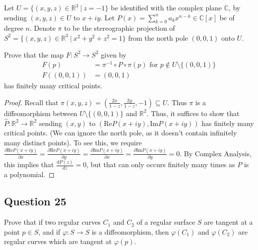\documentclass[12pt]{article}
\begin{document}
Let $U = \{(x, y, z) \in \mathbb{R}^3\ |\ z = -1\}$ be identified
with the complex plane $\mathbb C$, by sending $(x, y, z) \in U$ to $x + iy.$
Let $P(x) = \sum_{k = 0}^n a_k x^{n-k} \in \mathbb C[x]$ be of degree $n$.
Denote $\pi$ to be the stereographic projection
of $S^2 = \{(x, y, z) \in \mathbb{R}^3\ |\ x^2 + y^2 + z^2 = 1\}$
from the north pole $(0,0,1)$ onto $U$.

Prove that the map $F: S^2 \to S^2$ given by
\begin{align*}
    F(p) &= \pi^{-1}\circ P \circ \pi(p)\text{ for }p \not\in U\setminus\{(0,0,1)\}
    \\F((0,0,1)) &= (0,0,1)
\end{align*}
has finitely many critical points.

\begin{proof}
    Recall that $\pi(x, y, z) = \left(\frac{2x}{1-z}, \frac{2y}{1-z}, -1\right) \subseteq U$.
    Thus $\pi$ is a diffeomorphism between $U\setminus\{(0,0,1)\}$ and $\mathbb R^2$. Thus, it suffices to
    show that $\hat{P} : \mathbb R^2 \to \mathbb R^2$ sending $(x, y)$ to $(\mathrm{Re} P(x+iy), \mathrm{Im} P(x+iy))$
    has finitely many critical points. (We can ignore the north pole, as it doesn't contain infinitely many distinct points).
    To see this, we require $\frac{\partial \mathrm{Re} P(x+iy)}{\partial x}=\frac{\partial \mathrm{Re} P(x+iy)}{\partial y}=\frac{\partial \mathrm{Im} P(x+iy)}{\partial x}=\frac{\partial \mathrm{Im} P(x+iy)}{\partial y} = 0.$
    By Complex Analysis, this implies that $\frac{\mathrm dP(z)}{dz} = 0$, but that can only occurs finitely many times as $P$ is a polynomial.
\end{proof}

\subsection*{Question 25}
Prove that if two regular curves $C_1$ and $C_2$ of a regular surface $S$ are tangent at a point $p \in S$, and if $\varphi: S \to S$ is a diffeomorphism, then $\varphi(C_1)$ and $\varphi(C_2)$ are regular curves which are tangent at $\varphi(p)$.\\
\end{document}
